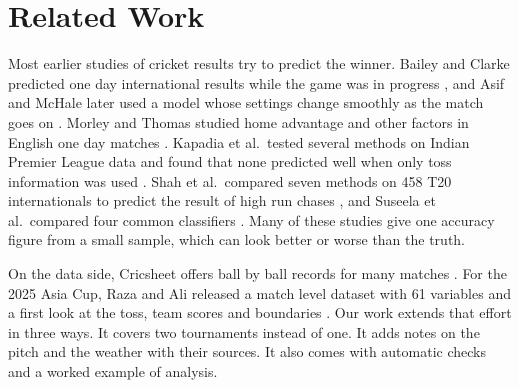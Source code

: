 \section{Related Work}
\label{sec:related}
Most earlier studies of cricket results try to predict the winner. Bailey and Clarke predicted one day international results while the game was in progress \cite{bailey2006}, and Asif and McHale later used a model whose settings change smoothly as the match goes on \cite{asif2016}. Morley and Thomas studied home advantage and other factors in English one day matches \cite{morley2005}. Kapadia et al.\ tested several methods on Indian Premier League data and found that none predicted well when only toss information was used \cite{kapadia2022}. Shah et al.\ compared seven methods on 458 T20 internationals to predict the result of high run chases \cite{shah2025}, and Suseela et al.\ compared four common classifiers \cite{suseela2025}. Many of these studies give one accuracy figure from a small sample, which can look better or worse than the truth.

On the data side, Cricsheet offers ball by ball records for many matches \cite{cricsheet}. For the 2025 Asia Cup, Raza and Ali released a match level dataset with 61 variables and a first look at the toss, team scores and boundaries \cite{razaarxiv,razadata}. Our work extends that effort in three ways. It covers two tournaments instead of one. It adds notes on the pitch and the weather with their sources. It also comes with automatic checks and a worked example of analysis.
